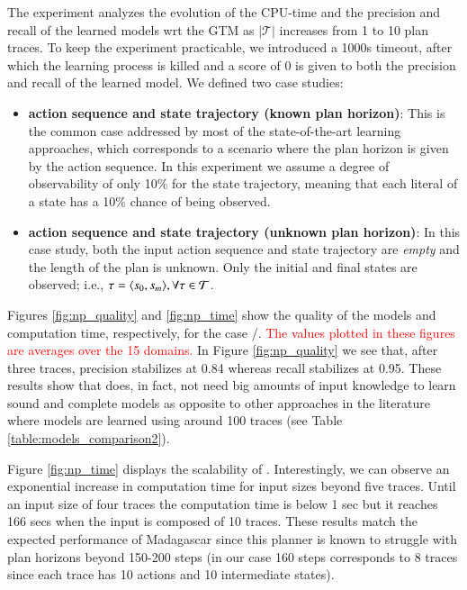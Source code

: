 The experiment analyzes the evolution of the CPU-time and the precision and recall of the learned models wrt the GTM as $|\mathcal{T}|$ increases from 1 to 10 plan traces. To keep the experiment practicable, we introduced a 1000s timeout, after which the learning process is killed and a score of $0$ is given to both the precision and recall of the learned model. We defined two case studies:

\begin{itemize}
	\item \textbf{\FO action sequence and \PO state trajectory (known plan horizon)}: This is the common case addressed by most of the state-of-the-art learning approaches, which corresponds to a scenario where the plan horizon is given by the action sequence. In this experiment we assume a degree of observability of only 10\% for the state trajectory, meaning that each literal of a state has a 10\% chance of being observed.
	\item  \textbf{\NO action sequence and \NO state trajectory (unknown plan horizon)}: In this case study, both the input action sequence and state trajectory are {\em empty} and the length of the plan is unknown. Only the initial and final states are observed; i.e., $\tau = {\langle s_0, s_m \rangle}, \forall \tau \in \mathcal{T}$.
\end{itemize}

Figures \ref{fig:np_quality} and \ref{fig:np_time} show the quality of the models and computation time, respectively, for the case \FO/\PO. \textcolor{red}{The values plotted in these figures are averages over the 15 domains.} In Figure \ref{fig:np_quality} we see that, after three traces, precision stabilizes at 0.84 whereas recall stabilizes at 0.95. These results show that \FAMA does, in fact, not need big amounts of input knowledge to learn sound and complete models as opposite to other approaches in the literature where models are learned using around 100 traces (see Table \ref{table:models_comparison2}).

Figure \ref{fig:np_time} displays the scalability of \FAMA. Interestingly, we can observe an exponential increase in computation time for input sizes beyond five traces. Until an input size of four traces the computation time is below 1 sec but it reaches 166 secs when the input is composed of 10 traces. These results match the expected performance of {\sc Madagascar} since this planner is known to struggle with plan horizons beyond 150-200 steps (in our case 160 steps corresponds to 8 traces since each trace has 10 actions and 10 intermediate states).

